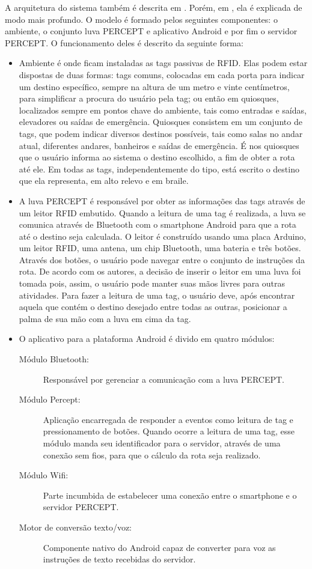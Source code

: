 \documentclass[english,brazilian]{UNISINOSmonografia}
\begin{document}
A arquitetura do sistema também é descrita em . Porém, em , ela é explicada de modo mais profundo. O modelo é formado pelos seguintes componentes: o ambiente, o conjunto luva PERCEPT e aplicativo Android e por fim o servidor PERCEPT. O funcionamento deles é descrito da seguinte forma:

\begin{itemize}
	\item Ambiente é onde ficam instaladas as tags passivas de RFID. Elas podem estar dispostas de duas formas: tags comuns, colocadas em cada porta para indicar um destino específico, sempre na altura de um metro e vinte centímetros, para simplificar a procura do usuário pela tag; ou então em quiosques, localizados sempre em pontos chave do ambiente, tais como entradas e saídas, elevadores ou saídas de emergência. Quiosques consistem em um conjunto de tags, que podem indicar diversos destinos possíveis, tais como salas no andar atual, diferentes andares, banheiros e saídas de emergência. É nos quiosques que o usuário informa ao sistema o destino escolhido, a fim de obter a rota até ele. Em todas as tags, independentemente do tipo, está escrito o destino que ela representa, em alto relevo e em braile.
	
	\item A luva PERCEPT é responsável por obter as informações das tags através de um leitor RFID embutido. Quando a leitura de uma tag é realizada, a luva se comunica através de Bluetooth com o smartphone Android para que a rota até o destino seja calculada. O leitor é construído usando uma placa Arduino, um leitor RFID, uma antena, um chip Bluetooth, uma bateria e três botões. Através dos botões, o usuário pode navegar entre o conjunto de instruções da rota. De acordo com os autores, a decisão de inserir o leitor em uma luva foi tomada pois, assim, o usuário pode manter suas mãos livres para outras atividades. Para fazer a leitura de uma tag, o usuário deve, após encontrar aquela que contém o destino desejado entre todas as outras, posicionar a palma de sua mão com a luva em cima da tag.

	\item O aplicativo para a plataforma Android é divido em quatro módulos:
	\begin{description}
		\item[Módulo Bluetooth:] Responsável por gerenciar a comunicação com a luva PERCEPT.
		\item[Módulo Percept:] Aplicação encarregada de responder a eventos como leitura de tag e pressionamento de botões. Quando ocorre a leitura de uma tag, esse módulo manda seu identificador para o servidor, através de uma conexão sem fios, para que o cálculo da rota seja realizado.
		\item [Módulo Wifi:] Parte incumbida de estabelecer uma conexão entre o smartphone e o servidor PERCEPT.
		\item [Motor de conversão texto/voz:] Componente nativo do Android capaz de converter para voz as instruções de texto recebidas do servidor.
	\end{description}


\end{itemize}
\end{document}
